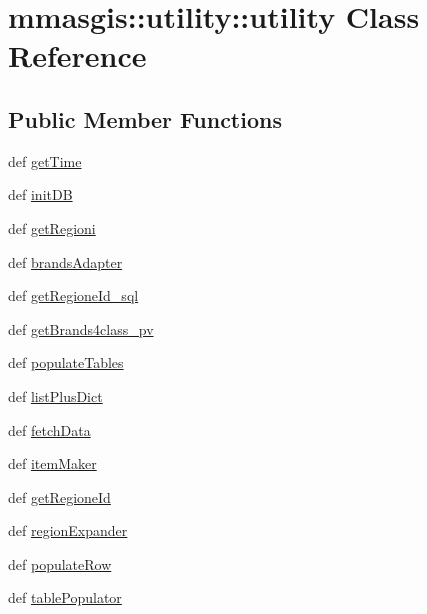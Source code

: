 \hypertarget{classmmasgis_1_1utility_1_1utility}{
\section{mmasgis::utility::utility Class Reference}
\label{classmmasgis_1_1utility_1_1utility}
}
\subsection*{Public Member Functions}
\begin{DoxyCompactItemize}
\item 
def \hyperlink{classmmasgis_1_1utility_1_1utility_ad79793f45829a4b9be1549e1f3b0be0a}{getTime}
\item 
def \hyperlink{classmmasgis_1_1utility_1_1utility_a1f4ab4d2a52297a2999c8bb0f4b6937e}{initDB}
\item 
def \hyperlink{classmmasgis_1_1utility_1_1utility_a82936b7dea74d25978c9ef6678f16c73}{getRegioni}
\item 
def \hyperlink{classmmasgis_1_1utility_1_1utility_ab4f14c2f80a5a61491e922c53d4dc5b5}{brandsAdapter}
\item 
def \hyperlink{classmmasgis_1_1utility_1_1utility_a3347c7d089c052ebb52a84e896c44b2f}{getRegioneId\_\-sql}
\item 
def \hyperlink{classmmasgis_1_1utility_1_1utility_ab1fc884b70f22b7412a3c952d137e274}{getBrands4class\_\-pv}
\item 
def \hyperlink{classmmasgis_1_1utility_1_1utility_a5b7e88319d101ca9d2aeacfcba407815}{populateTables}
\item 
def \hyperlink{classmmasgis_1_1utility_1_1utility_a1c008fa0c80aef52d7fac90551f34b5c}{listPlusDict}
\item 
def \hyperlink{classmmasgis_1_1utility_1_1utility_a8064fc0cdf21c29a9ac80e79a7baa5bd}{fetchData}
\item 
def \hyperlink{classmmasgis_1_1utility_1_1utility_a30c1c3ac76f6b0b7f8e2a7ef1d0ff328}{itemMaker}
\item 
def \hyperlink{classmmasgis_1_1utility_1_1utility_a7f09213243194eae846fcf0c982682f0}{getRegioneId}
\item 
def \hyperlink{classmmasgis_1_1utility_1_1utility_afdd5ad0cb940736f8acb8a50367b84a8}{regionExpander}
\item 
def \hyperlink{classmmasgis_1_1utility_1_1utility_a7cdc891cf0cd50813fb752122188ae75}{populateRow}
\item 
def \hyperlink{classmmasgis_1_1utility_1_1utility_ae586a591fce45bd291a96bc663f7d4cb}{tablePopulator}

\end{DoxyCompactItemize}
